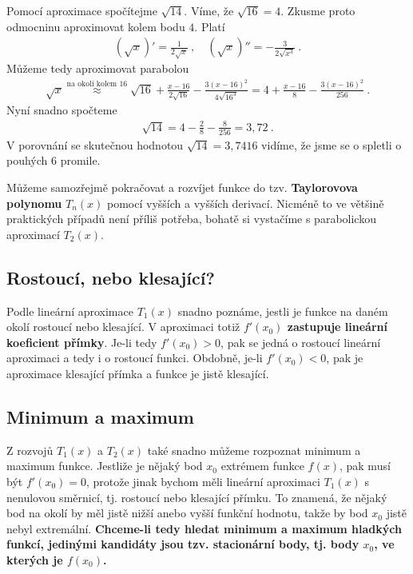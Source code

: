\begin{example}
    Pomocí aproximace spočítejme $\sqrt{14}$. Víme, že $\sqrt{16} = 4$. Zkusme proto odmocninu aproximovat kolem bodu $4$. Platí \begin{align}
        (\sqrt{x})' = \frac{1}{2 \sqrt{x}} \:, \quad (\sqrt{x} )'' = -\frac{3}{2 \sqrt{x^3}} \:.
    \end{align}
    Můžeme tedy aproximovat parabolou \begin{align}
        \sqrt{x} \overset{\text{na okolí kolem }16} \approx \sqrt{16} + \frac{x-16}{2 \sqrt{16}}  -\frac{3(x-16)^2}{4 \sqrt{16^3}} = 4 + \frac{x-16}{8} - \frac{3(x-16)^2}{256}\:.
    \end{align}
    Nyní snadno spočteme \begin{align}
        \sqrt{14} = 4 - \frac{2}{8} - \frac{8}{256} = 3,72 \:.
    \end{align}
    V porovnání se skutečnou hodnotou $\sqrt{14} = 3,7416$ vidíme, že jsme se o spletli o pouhých $6$ promile.
\end{example}

Můžeme samozřejmě pokračovat a rozvíjet funkce do tzv. \textbf{Taylorovova polynomu} $T_n(x)$ pomocí vyšších a vyšších derivací. Nicméně to ve většině praktických případů není příliš potřeba, bohatě si vystačíme s parabolickou aproximací $T_2(x)$.

\subsection{Rostoucí, nebo klesající?}

Podle lineární aproximace $T_1(x)$ snadno poznáme, jestli je funkce na daném okolí rostoucí nebo klesající. V aproximaci totiž \textbf{$f'(x_0)$ zastupuje lineární koeficient přímky}. Je-li tedy $f'(x_0)>0$, pak se jedná o rostoucí lineární aproximaci a tedy i o rostoucí funkci. Obdobně, je-li $f'(x_0) <0$, pak je aproximace klesající přímka a funkce je jistě klesající.

\subsection{Minimum a maximum}

Z rozvojů $T_1(x)$ a $T_2(x)$ také snadno můžeme rozpoznat minimum a maximum funkce. 
Jestliže je nějaký bod $x_0$ extrémem funkce $f(x)$, pak musí být $f'(x_0)=0$, protože jinak bychom měli lineární aproximaci $T_1(x)$ s nenulovou směrnicí, tj. rostoucí nebo klesající přímku. To znamená, že nějaký bod na okolí by měl jistě nižší anebo vyšší funkční hodnotu, takže by bod $x_0$ jistě nebyl extremální. \textbf{Chceme-li tedy hledat minimum a maximum hladkých funkcí, jedinými kandidáty jsou tzv. stacionární body, tj. body $x_0$, ve kterých je $f(x_0)$.} 

